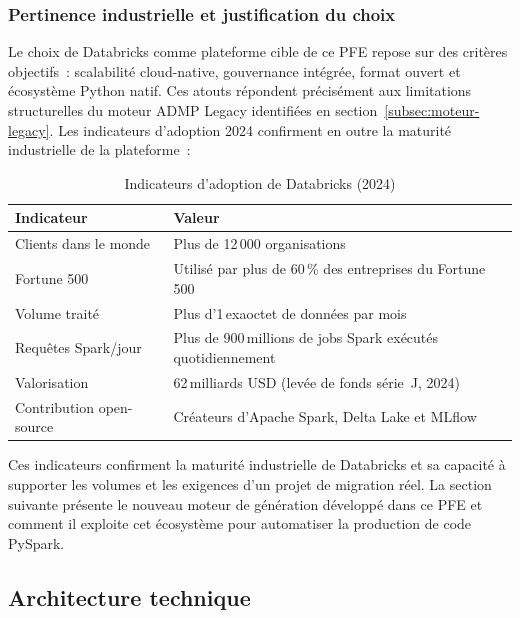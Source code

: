 \subsubsection*{Pertinence industrielle et justification du choix}

Le choix de Databricks comme plateforme cible de ce PFE repose sur des critères objectifs~: scalabilité cloud-native, gouvernance intégrée, format ouvert et écosystème Python natif. Ces atouts répondent précisément aux limitations structurelles du moteur ADMP Legacy identifiées en section~\ref{subsec:moteur-legacy}. Les indicateurs d'adoption 2024 confirment en outre la maturité industrielle de la plateforme~:

\begin{table}[H]
\centering
\caption{Indicateurs d'adoption de Databricks (2024)}
\label{tab:databricks-stats}
\begin{tabularx}{\textwidth}{lX}
\toprule
\textbf{Indicateur} & \textbf{Valeur} \\
\midrule
Clients dans le monde & Plus de 12\,000 organisations \\
\addlinespace
Fortune 500 & Utilisé par plus de 60\,\% des entreprises du Fortune\,500 \\
\addlinespace
Volume traité & Plus d'1\,exaoctet de données par mois \\
\addlinespace
Requêtes Spark/jour & Plus de 900\,millions de jobs Spark exécutés quotidiennement \\
\addlinespace
Valorisation & 62\,milliards USD (levée de fonds série~J, 2024) \\
\addlinespace
Contribution open-source & Créateurs d'Apache Spark, Delta Lake et MLflow \\
\bottomrule
\end{tabularx}
\end{table}

Ces indicateurs confirment la maturité industrielle de Databricks et sa capacité à supporter les volumes et les exigences d'un projet de migration réel. La section suivante présente le nouveau moteur de génération développé dans ce PFE et comment il exploite cet écosystème pour automatiser la production de code PySpark.

\subsection{Architecture technique}
\label{subsec:archi-databricks}


